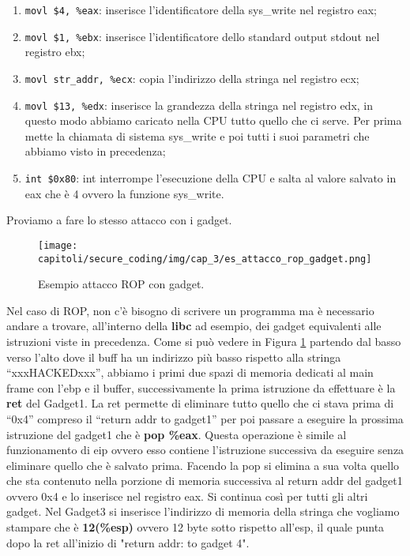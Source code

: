 \begin{enumerate}
    \item \verb|movl $4, %eax|: inserisce
          l'identificatore della sys\_write nel registro eax;
    \item \verb|movl $1, %ebx|: inserisce l'identificatore
          dello standard output stdout nel registro ebx;
    \item \verb|movl str_addr, %ecx|: copia l'indirizzo della stringa nel registro ecx;
    \item \verb|movl $13, %edx|: inserisce la grandezza della
          stringa nel registro edx, in questo modo abbiamo caricato nella
          CPU tutto quello che ci serve. Per prima  mette la chiamata di
          sistema sys\_write e poi tutti i suoi parametri che abbiamo visto in
          precedenza;
    \item \verb|int $0x80|: int interrompe l'esecuzione della CPU e salta al
          valore salvato in eax che è 4 ovvero la funzione sys\_write.
\end{enumerate}

Proviamo a fare lo stesso attacco con i gadget.

\begin{figure}[H]
    \centering
    \texttt{[image: capitoli/secure\_coding/img/cap\_3/es\_attacco\_rop\_gadget.png]}
    \caption{Esempio attacco ROP con gadget.}\label{fig:es_attacco_rop_gadget}
\end{figure}

Nel caso di ROP, non c'è bisogno di scrivere un programma ma è necessario andare a
trovare, all'interno della \textbf{libc} ad esempio, dei gadget equivalenti alle
istruzioni viste in precedenza.
Come si può vedere in Figura \ref{fig:es_attacco_rop_gadget} partendo dal basso verso
l'alto dove il buff ha un indirizzo più basso rispetto
alla stringa ``xxxHACKEDxxx'', abbiamo i primi due spazi di memoria dedicati al main
frame con l'ebp e il buffer,
successivamente la prima istruzione da effettuare è la \textbf{ret} del Gadget1.
La ret permette di eliminare tutto quello che ci stava prima di ``0x4'' compreso il
``return addr to gadget1'' per poi passare a eseguire la prossima
istruzione del gadget1 che è \textbf{pop \%eax}.
Questa operazione è simile al funzionamento di eip ovvero esso contiene l'istruzione
successiva da eseguire senza eliminare quello che è salvato prima.
Facendo la pop si elimina a sua volta quello che sta contenuto nella porzione di
memoria successiva al return addr del gadget1 ovvero 0x4 e lo
inserisce nel registro eax. Si continua così per tutti gli altri gadget.
Nel Gadget3 si inserisce l'indirizzo di memoria della stringa che vogliamo stampare
che è \textbf{12(\%esp)}
ovvero 12 byte sotto rispetto all'esp, il quale punta dopo la ret all'inizio
di "return addr: to gadget 4".

